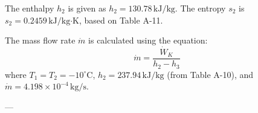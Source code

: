 The enthalpy \( h_2 \) is given as \( h_2 = 130.78 \, \text{kJ/kg} \). The entropy \( s_2 \) is \( s_2 = 0.2459 \, \text{kJ/kg·K} \), based on Table A-11.  

The mass flow rate \( \dot{m} \) is calculated using the equation:  
\[
\dot{m} = \frac{\dot{W}_K}{h_2 - h_3}
\]  
where \( T_1 = T_2 = -10^\circ\text{C} \), \( h_2 = 237.94 \, \text{kJ/kg} \) (from Table A-10), and \( \dot{m} = 4.198 \times 10^{-4} \, \text{kg/s} \).  

---